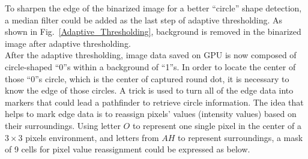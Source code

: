 To sharpen the edge of the binarized image for a better \enquote{circle} shape detection, a median filter could be added as the last step of adaptive thresholding. As shown in Fig.~\ref{Adaptive_Thresholding}, background is removed in the binarized image after adaptive thresholding.
\\\indent
%
%
After the adaptive thresholding, image data saved on \gls{GPU} is now composed of circle-shaped \enquote{0}s within a background of \enquote{1}s. In order to locate the center of those \enquote{0}s circle, which is the center of captured round dot, it is necessary to know the edge of those circles. A trick is used to turn all of the edge data into markers that could lead a pathfinder to retrieve circle information.%
%
The idea that helps to mark edge data is to reassign pixels' values (intensity values) based on their surroundings. Using letter \(O\) to represent one single pixel in the center of a $3\times3$ pixels environment, and letters from \(A\)\texttildelow \(H\) to represent surroundings, a mask of 9 cells for pixel value reassignment could be expressed as below.

